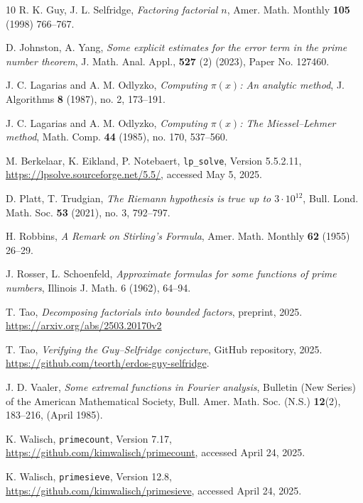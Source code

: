 \documentclass[10pt,a4paper,reqno]{amsart}
\numberwithin{equation}{section}
\theoremstyle{plain}
\theoremstyle{definition}
\begin{document}
\begin{thebibliography}{10}
R. K. Guy, J. L. Selfridge, \emph{Factoring factorial $n$}, Amer. Math. Monthly \textbf{105} (1998) 766--767.

D. Johnston, A. Yang, \emph{Some explicit estimates for the error term in the prime number theorem}, J. Math. Anal. Appl., \textbf{527} (2) (2023), Paper No. 127460.

J. C. Lagarias and A. M. Odlyzko, \emph{Computing $\pi(x)$: An analytic method}, J. Algorithms \textbf{8} (1987), no. 2, 173--191.

J. C. Lagarias and A. M. Odlyzko, \emph{Computing $\pi(x)$: The Miessel--Lehmer method}, Math. Comp. \textbf{44} (1985), no. 170, 537--560.

M. Berkelaar, K. Eikland, P. Notebaert, \texttt{lp\_solve}, Version 5.5.2.11, \url{https://lpsolve.sourceforge.net/5.5/}, accessed May 5, 2025.

D. Platt, T. Trudgian, \emph{The Riemann hypothesis is true up to $3\cdot10^{12}$}, Bull. Lond. Math. Soc. \textbf{53} (2021), no. 3, 792--797.

H. Robbins, \emph{A Remark on Stirling's Formula}, Amer. Math. Monthly \textbf{62} (1955) 26--29.


J. Rosser, L. Schoenfeld, \emph{Approximate formulas for some functions of prime numbers}, Illinois J. Math. 6 (1962), 64--94.

T. Tao, \emph{Decomposing factorials into bounded factors}, preprint, 2025. \url{https://arxiv.org/abs/2503.20170v2}

T. Tao, \emph{Verifying the Guy--Selfridge conjecture}, GitHub repository, 2025.  \url{https://github.com/teorth/erdos-guy-selfridge}.

J. D. Vaaler, \emph{Some extremal functions in Fourier analysis}, Bulletin (New Series) of the American Mathematical Society, Bull. Amer. Math. Soc. (N.S.) \textbf{12}(2), 183--216, (April 1985).

K. Walisch, \texttt{primecount}, Version 7.17, \url{https://github.com/kimwalisch/primecount}, accessed April 24, 2025. 

K. Walisch, \texttt{primesieve}, Version 12.8, \url{https://github.com/kimwalisch/primesieve}, accessed April 24, 2025. 

\end{thebibliography}
\end{document}

